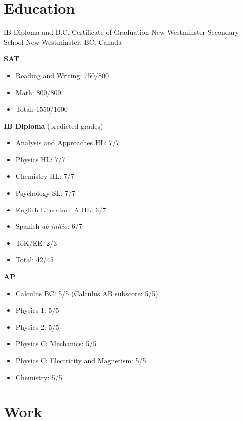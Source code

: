 \documentclass[sans]{moderncv}
\begin{document}
\makecvtitle

\section{Education}


{IB Diploma and B.C. Certificate of Graduation}
{New Westminster Secondary School}
{New Westminster, BC, Canada}
{}
{
  \textbf{SAT}
  \begin{itemize}
    \item Reading and Writing: 750/800
    \item Math: 800/800
    \item Total: 1550/1600
  \end{itemize}
  \textbf{IB Diploma} (predicted grades)
  \begin{itemize}
    \item Analysis and Approaches HL: 7/7
    \item Physics HL: 7/7
    \item Chemistry HL: 7/7
    \item Psychology SL: 7/7
    \item English Literature A HL: 6/7
    \item Spanish \textit{ab initio}: 6/7
    \item ToK/EE: 2/3
    \item Total: 42/45
  \end{itemize}
  \textbf{AP}
  \begin{itemize}
    \item Calculus BC: 5/5 (Calculus AB subscore: 5/5)
    \item Physics 1: 5/5
    \item Physics 2: 5/5
    \item Physics C: Mechanics: 5/5
    \item Physics C: Electricity and Magnetism: 5/5
    \item Chemistry: 5/5
  \end{itemize}
}

\section{Work}
\end{document}
